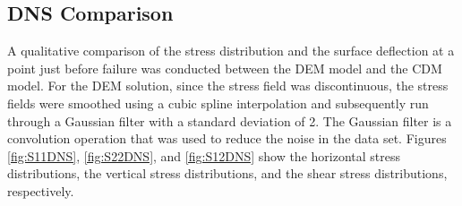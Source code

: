 \subsection{DNS Comparison}

A qualitative comparison of the stress distribution and the surface deflection at a point just before failure was conducted between the DEM model and the CDM model. For the DEM solution, since the stress field was discontinuous, the stress fields were smoothed using a cubic spline interpolation and subsequently run through a Gaussian filter with a standard deviation of 2. The Gaussian filter is a convolution operation that was used to reduce the noise in the data set. Figures \ref{fig:S11DNS}, \ref{fig:S22DNS}, and \ref{fig:S12DNS} show the horizontal stress distributions, the vertical stress distributions, and the shear stress distributions, respectively.